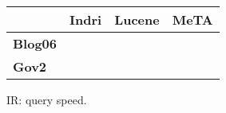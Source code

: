 \begin{figure}[t]
\centering
{\small
\begin{tabular}{|l|r|r|r|}
    \hline & \textbf{Indri} & \textbf{Lucene} & \textbf{MeTA} \\
    \hline
    \textbf{Blog06} & & & \\
    \textbf{Gov2} & & & \\
    \hline
\end{tabular}
\caption{IR: query speed.}
}
\label{fig:ir-query-speed}
\end{figure}
